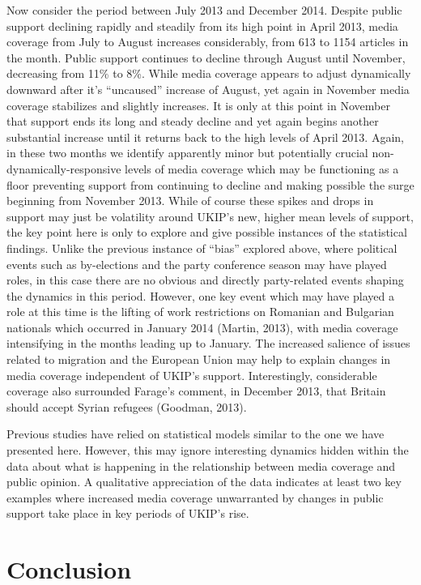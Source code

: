 \documentclass[12pt,article]{article}
\begin{document}
Now consider the period between July 2013 and December 2014. Despite
public support declining rapidly and steadily from its high point in
April 2013, media coverage from July to August increases considerably,
from 613 to 1154 articles in the month. Public support continues to
decline through August until November, decreasing from 11\% to 8\%.
While media coverage appears to adjust dynamically downward after it's
``uncaused'' increase of August, yet again in November media coverage
stabilizes and slightly increases. It is only at this point in November
that support ends its long and steady decline and yet again begins
another substantial increase until it returns back to the high levels of
April 2013. Again, in these two months we identify apparently minor but
potentially crucial non-dynamically-responsive levels of media coverage
which may be functioning as a floor preventing support from continuing
to decline and making possible the surge beginning from November 2013.
While of course these spikes and drops in support may just be volatility
around UKIP's new, higher mean levels of support, the key point here is
only to explore and give possible instances of the statistical findings.
Unlike the previous instance of ``bias'' explored above, where political
events such as by-elections and the party conference season may have
played roles, in this case there are no obvious and directly
party-related events shaping the dynamics in this period. However, one
key event which may have played a role at this time is the lifting of
work restrictions on Romanian and Bulgarian nationals which occurred in
January 2014 (Martin, 2013), with media coverage intensifying in the
months leading up to January. The increased salience of issues related
to migration and the European Union may help to explain changes in media
coverage independent of UKIP's support. Interestingly, considerable
coverage also surrounded Farage's comment, in December 2013, that
Britain should accept Syrian refugees (Goodman, 2013).

Previous studies have relied on statistical models similar to the one we
have presented here. However, this may ignore interesting dynamics
hidden within the data about what is happening in the relationship
between media coverage and public opinion. A qualitative appreciation of
the data indicates at least two key examples where increased media
coverage unwarranted by changes in public support take place in key
periods of UKIP's rise.

\section{Conclusion}\label{conclusion}
\end{document}
